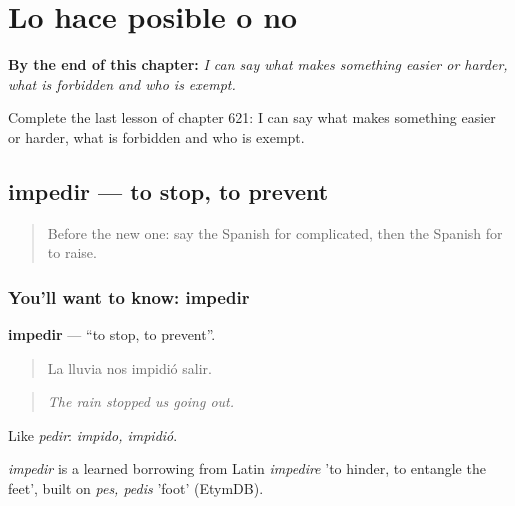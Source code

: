 
\chapter{Lo hace posible o no}
\label{ch:es-lo-hace-posible-o-no}

\begin{chapteropening}
\textbf{By the end of this chapter:} \emph{I can say what makes something easier or harder, what is forbidden and who is exempt.}

Complete the last lesson of chapter 621: I can say what makes something easier or harder, what is forbidden and who is exempt.
\end{chapteropening}

\section[impedir]{impedir — to stop, to prevent}

\label{lesson:ES-C621-impedir}



\begin{quote}
Before the new one: say the Spanish for complicated, then the Spanish for to raise.
\end{quote}

\subsection*{You'll want to know: impedir}
\textbf{impedir} — \textquotedblleft{}to stop, to prevent\textquotedblright{}.

\begin{quote}
La lluvia nos impidió salir.
\end{quote}

\begin{quote}
\emph{The rain stopped us going out.}
\end{quote}

Like \emph{pedir}: \emph{impido, impidió}.

\begin{cousinweb}
\emph{impedir} is a learned borrowing from Latin \emph{impedire} 'to hinder, to entangle the feet', built on \emph{pes, pedis} 'foot' (EtymDB).
\end{cousinweb}

